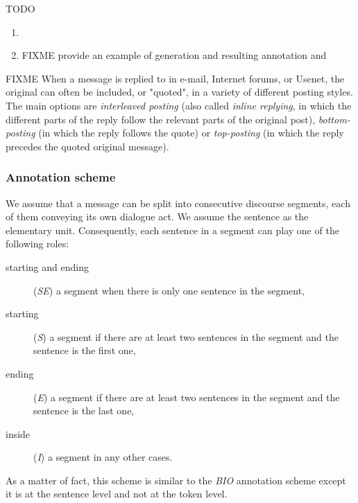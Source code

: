TODO 
\begin{enumerate}
\item 
\item FIXME provide an example of generation and resulting annotation and 
\end{enumerate}

FIXME When a message is replied to in e-mail, Internet forums, or Usenet, the original can often be included, or "quoted", in a variety of different posting styles.
%
The main options are {\em interleaved posting} (also called {\em inline replying}, in which the different parts of the reply follow the relevant parts of the original post), \textit{bottom-posting} (in which the reply follows the quote) or \textit{top-posting} (in which the reply precedes the quoted original message). 


\subsubsection{Annotation scheme}
\label{}


We assume that a message can be split into %
 consecutive discourse segments, each of them conveying its own dialogue act.
We assume the sentence as the elementary unit.
Consequently, each sentence in a segment can play one of the following roles: 
\begin{description}
\item [starting and ending] (\textit{SE}) a segment when there is only one sentence in the segment, 
\item [starting] (\textit{S}) a segment if there are at least two sentences in the segment and the sentence is the first one, 
\item [ending] (\textit{E}) a segment if there are at least two sentences in the segment and the sentence is the last one, 
\item [inside] (\textit{I}) a segment in any other cases.
\end{description}
%
As a matter of fact, this scheme is similar to the \textit{BIO} annotation scheme except it is at the sentence level and not at the token level.


